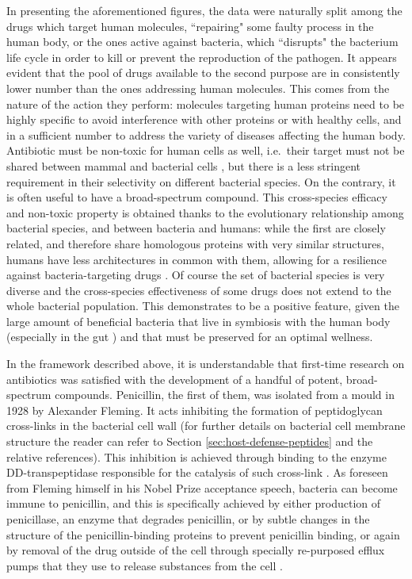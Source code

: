 In presenting the aforementioned figures, the data were naturally split among the drugs which target human molecules, ``repairing" some faulty process in the human body, or the ones active against bacteria, which ``disrupts" the bacterium life cycle in order to kill or prevent the reproduction of the pathogen.
%
It appears evident that the pool of drugs available to the second purpose are in consistently lower number than the ones addressing human molecules. This comes from the nature of the action they perform: molecules targeting human proteins need to be highly specific to avoid interference with other proteins or with healthy cells, and in a sufficient number to address the variety of diseases affecting the human body.
%
Antibiotic must be non-toxic for human cells as well, i.e.\ their target must not be shared between mammal and bacterial cells \cite{???}, but there is a less stringent requirement in their selectivity on different bacterial species. On the contrary, it is often useful to have a broad-spectrum compound. This cross-species efficacy and non-toxic property is obtained thanks to the evolutionary relationship among bacterial species, and between bacteria and humans: while the first are closely related, and therefore share homologous proteins with very similar structures, humans have less architectures in common with them, allowing for a resilience against bacteria-targeting drugs \cite{???}.
%
Of course the set of bacterial species is very diverse and the cross-species effectiveness of some drugs does not extend to the whole bacterial population. This demonstrates to be a positive feature, given the large amount of beneficial bacteria that live in symbiosis with the human body (especially in the gut \cite{???}) and that must be preserved for an optimal wellness.

In the framework described above, it is understandable that first-time research on antibiotics was satisfied with the development of a handful of potent, broad-spectrum compounds.
%
Penicillin, the first of them, was isolated from a mould in 1928 by Alexander Fleming. It acts inhibiting the formation of peptidoglycan cross-links in the bacterial cell wall (for further details on bacterial cell membrane structure the reader can refer to Section \ref{sec:host-defense-peptides} and the relative references). This inhibition is achieved through binding to the enzyme DD-transpeptidase responsible for the catalysis of such cross-link \cite{Gordon2000}.
%
As foreseen from Fleming himself in his Nobel Prize acceptance speech, bacteria can become immune to penicillin, and this is specifically achieved by either production of penicillase, an enzyme that degrades penicillin, or by subtle changes in the structure of the penicillin-binding proteins to prevent penicillin binding, or again by removal of the drug outside of the cell through specially re-purposed efflux pumps that they use to release substances from the cell \cite{???}.

